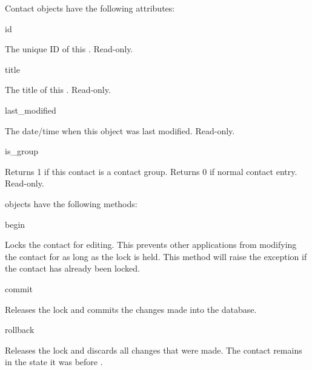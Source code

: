 \begin{classdesc*}{Contact}
 objects have the following attributes:

\begin{memberdesc}[Contact]{id}

The unique ID of this . Read-only.

\end{memberdesc}

\begin{memberdesc}[Contact]{title}

The title of this . Read-only.

\end{memberdesc}

\begin{memberdesc}[Contact]{last_modified}

The date/time when this  object was last modified. Read-only.

\end{memberdesc}

\begin{memberdesc}[Contact]{is_group}

Returns 1 if this contact is a contact group. Returns 0 if normal contact entry. Read-only.

\end{memberdesc}

 objects have the following methods:

\begin{methoddesc}[Contact]{begin}{}

Locks the contact for editing. This prevents other applications from 
modifying the contact for as long as the lock is held. This method will 
raise the exception  if the contact has already been 
locked.

\end{methoddesc}

\begin{methoddesc}[Contact]{commit}{}

Releases the lock and commits the changes made into the database.

\end{methoddesc}

\begin{methoddesc}[Contact]{rollback}{}

Releases the lock and discards all changes that were made. The contact 
remains in the state it was before .


\end{methoddesc}
\end{classdesc*}
